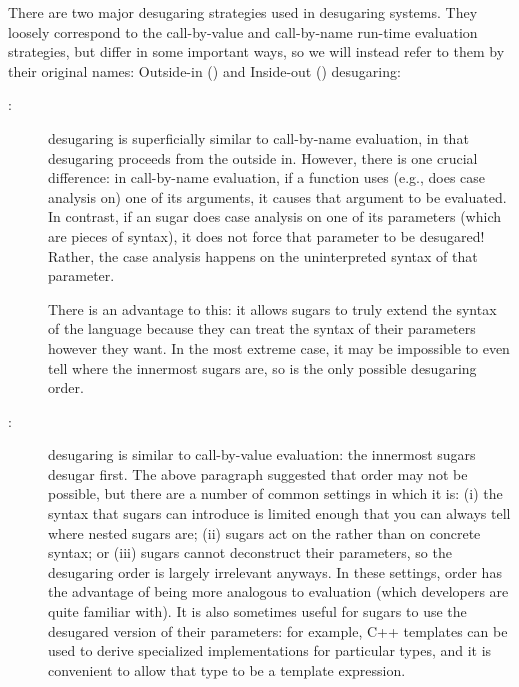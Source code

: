 There are two major desugaring strategies used in desugaring systems.
They loosely correspond to the call-by-value and call-by-name run-time evaluation strategies, but
differ in some important ways, so we will instead refer
to them by their original names: Outside-in () and
Inside-out () desugaring:~\cite{expansion-order}
\begin{description}
\item[:]  desugaring is superficially similar to call-by-name
  evaluation, in that desugaring proceeds from the outside in.
  However, there is one crucial difference: in call-by-name evaluation, if a
  function uses (e.g., does case analysis on) one of its
  arguments, it causes that argument to be evaluated. In contrast,
  if an  sugar does case analysis on one of its
  parameters (which are pieces of syntax), it does not force that
  parameter to be desugared! Rather, the case analysis happens on the
  uninterpreted syntax of that parameter.

  There is an advantage to this: it allows sugars to truly extend the
  syntax of the language because they can treat the syntax of their
  parameters however they want.
  In the most extreme case, it may be impossible
  to even tell where the innermost sugars are, so  is the only
  possible desugaring order.
\item[:]  desugaring is similar to call-by-value evaluation: the
  innermost sugars desugar first. The above paragraph suggested that
   order may not be possible, but there are a number of common
  settings in which it is: (i) the syntax that sugars can introduce is
  limited enough that you can always tell where nested sugars are;
  (ii) sugars act on the  rather than on concrete syntax; or
  (iii) sugars cannot deconstruct their parameters, so the desugaring
  order is largely irrelevant anyways. In these settings, 
  order has the advantage of being more analogous to evaluation (which
  developers are quite familiar with). It is
  also sometimes useful for sugars to use the desugared version of
  their parameters: for example, C++ templates can be used to derive
  specialized implementations for particular types, and it is
  convenient to allow that type to be a template expression.
\end{description}


